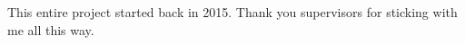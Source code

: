 \cleardoublepage

\begin{dedication}
  This entire project started back in 2015. Thank you supervisors for sticking with me all this way.
\end{dedication}